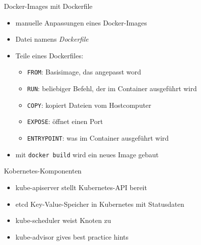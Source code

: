 


\begin{flashcard}[Definition]{Docker-Images mit Dockerfile}
    \begin{itemize}
        \item manuelle Anpassungen eines Docker-Images
        \item Datei namens \emph{Dockerfile}
        \item Teile eines Dockerfiles:
            \begin{itemize}
                \item \texttt{FROM}: Basisimage, das angepasst word
                \item \texttt{RUN}: beliebiger Befehl, der im Container ausgeführt wird
                \item \texttt{COPY}: kopiert Dateien vom Hostcomputer
                \item \texttt{EXPOSE}: öffnet einen Port
                \item \texttt{ENTRYPOINT}: was im Container ausgeführt wird
            \end{itemize}
        \item mit \texttt{docker build} wird ein neues Image gebaut
    \end{itemize}
\end{flashcard}


\begin{flashcard}[Definition]{Kobernetes-Komponenten}
    \begin{itemize}
        \item kube-apiserver\newline
            stellt Kubernetes-API bereit
        \item etcd\newline
            Key-Value-Speicher in Kubernetes mit Statusdaten
        \item kube-scheduler\newline
            weist Knoten zu
        \item kube-advisor\newline
            gives best practice hints
    \end{itemize}
\end{flashcard}

